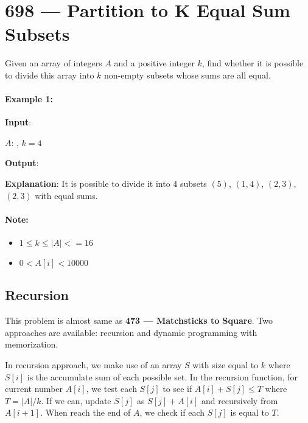 \section{698 --- Partition to K Equal Sum Subsets}
Given an array of integers $A$ and a positive integer $k$, find whether it is possible to divide this array into $k$ non-empty subsets whose sums are all equal.
\paragraph{Example 1:}
\begin{flushleft}
\textbf{Input}:

$A$:  \fcc{[4, 3, 2, 3, 5, 2, 1]}, $k = 4$

\textbf{Output}: 

\textbf{Explanation}: It is possible to divide it into 4 subsets $(5)$, $(1, 4)$, $(2,3)$, $(2,3)$ with equal sums.

\end{flushleft}


\paragraph{Note:}

\begin{itemize}

\item $1 \leq k \leq |A| <= 16$
\item $0 < A[i] < 10000$
\end{itemize}

\subsection{Recursion}

This problem is almost same as \textbf{473 --- Matchsticks to Square}. Two approaches are available: recursion and dynamic programming with memorization.

In recursion approach, we make use of an array $S$ with size equal to $k$ where $S[i]$ is the accumulate sum of each possible set. In the recursion function, for current number $A[i]$, we test each $S[j]$ to see if $A[i]+S[j]\leq T$ where $T=\lvert A\rvert/k$. If we can, update $S[j]$ as $S[j] +A[i]$ and recursively from $A[i+1]$. When reach the end of $A$, we check if each $S[j]$ is equal to $T$. 

